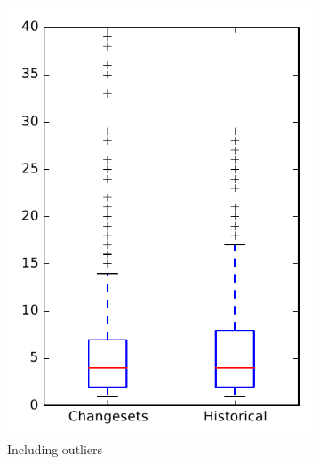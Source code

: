 
\begin{figure}
    \centering
    \begin{subfigure}{.4\textwidth}
        \centering
        \includegraphics[height=0.4\textheight]{figures/dit/rq2_overview}
        \caption{Including outliers}\label{fig:dit:rq2:overview_outlier}
    \end{subfigure}%
    \begin{subfigure}{.4\textwidth}
        \centering

\end{subfigure}
\end{figure}
